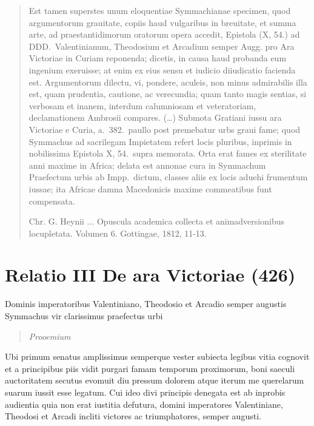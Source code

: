 
\begin{quotation}

Est tamen superstes unum eloquentiae Symmachianae specimen, quod argumentorum grauitate, copiis haud vulgaribus in breuitate, et summa arte, ad praestantidimorum oratorum opera accedit, Epistola (X, 54.) ad DDD.\ Valentinianum, Theodosium et Arcadium semper Augg. pro Ara Victoriae in Curiam reponenda; dicetis, in causa haud probanda eum ingenium exeruisse; at enim ex eius sensu et iudicio diiudicatio facienda est. Argumentorum dilectu, vi, pondere, aculeis, non minus admirabilis illa est, quam prudentia, cautione, ac verecundia; quam tanto magis sentias, si verbosam et inanem, interdum calumniosam et veteratoriam, declamationem Ambrosii compares. (\dots) Submota Gratiani iussu ara Victoriae e Curia, a.\ 382.\ paullo post premebatur urbs graui fame; quod Symmachus ad sacrilegam Impietatem refert locis pluribus, inprimis in nobilissima Epistola X, 54.\ supra memorata. Orta erat fames ex sterilitate anni maxime in Africa; delata est annonae cura in Symmachum Praefectum urbis ab Impp.\ dictum, classes aliis ex locis aduehi frumentum iussae; ita Africae damna Macedonicis maxime commeatibus funt compensata.

\noindent Chr. G. Heynii ... Opuscula academica collecta et animadversionibus locupletata. Volumen 6. Gottingae, 1812, 11-13.

\end{quotation}

\newpage


\section*{Relatio III De ara Victoriae (426)}

Dominis imperatoribus Valentiniano, Theodosio et Arcadio semper augustis Symmachus vir clarissimus praefectus urbi

\begin{quote}
\textit{Prooemium}
\end{quote}

Ubi primum senatus amplissimus semperque vester subiecta legibus vitia cognovit et a principibus piis vidit purgari famam temporum proximorum, boni saeculi auctoritatem secutus evomuit diu pressum dolorem atque iterum me querelarum suarum iussit esse legatum. Cui ideo divi principis denegata est ab inprobis audientia quia non erat iustitia defutura, domini imperatores Valentiniane, Theodosi et Arcadi incliti victores ac triumphatores, semper augusti.

